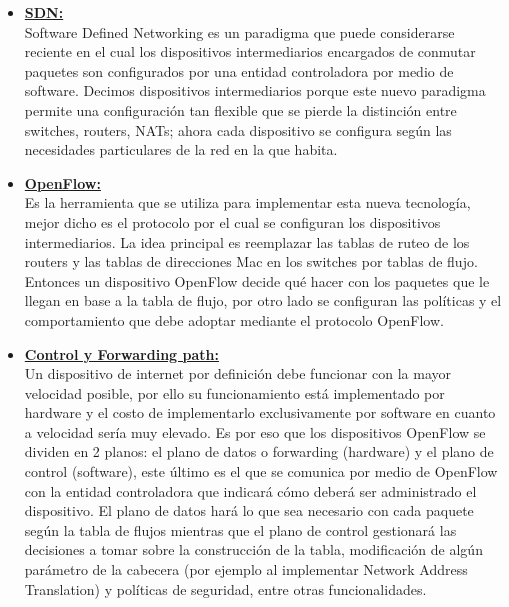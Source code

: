 \begin{itemize}
	\item \underline{\textbf{SDN:}}\\
		Software Defined Networking es un paradigma que puede considerarse reciente en el cual los dispositivos intermediarios 			encargados de conmutar paquetes son configurados por una entidad controladora por medio de software. Decimos dispositivos 			intermediarios porque este nuevo paradigma permite una configuración tan flexible que se pierde la distinción entre switches, 			routers, NATs; ahora cada dispositivo se configura según las necesidades particulares de la red en la que habita.

	\item \underline{\textbf{OpenFlow:}}\\
		Es la herramienta que se utiliza para implementar esta nueva tecnología, mejor dicho es el protocolo por el cual se configuran 			los dispositivos intermediarios. La idea principal es reemplazar las tablas de ruteo de los routers y las tablas de direcciones 		Mac en los switches por tablas de flujo. Entonces un dispositivo OpenFlow decide qué hacer con los paquetes que le llegan en 			base a la tabla de flujo, por otro lado se configuran las políticas y el comportamiento que debe adoptar mediante el protocolo 			OpenFlow.

	\item \underline{\textbf{Control y Forwarding path:}}\\
		Un dispositivo de internet por definición debe funcionar con la mayor velocidad posible, por ello su funcionamiento está 			implementado por hardware y el costo de implementarlo exclusivamente por software en cuanto a velocidad sería muy elevado. Es 			por eso que los dispositivos OpenFlow se dividen en 2 planos: el plano de datos o forwarding (hardware) y el plano de control 			(software), este último es el que se comunica por medio de OpenFlow con la entidad controladora que indicará cómo deberá ser 			administrado el dispositivo. El plano de datos hará lo que sea necesario con cada paquete según la tabla de flujos mientras que 		el plano de control gestionará las decisiones a tomar sobre la construcción de la tabla, modificación de algún parámetro de la 			cabecera (por ejemplo al implementar Network Address Translation) y políticas de seguridad, entre otras funcionalidades.


\end{itemize}
